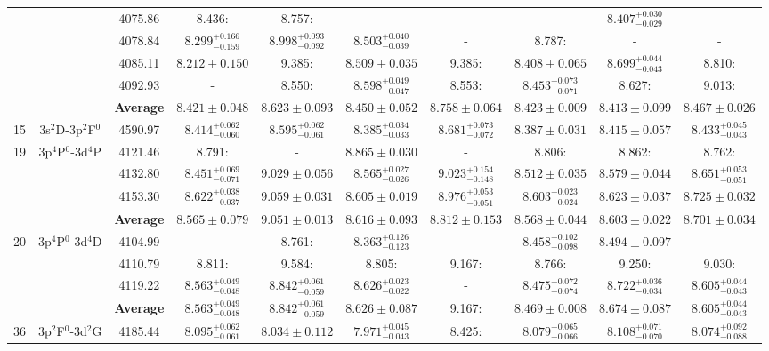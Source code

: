 \documentclass[fleqn,usenatbib]{mnras}
\begin{document}
\begin{sidewaystable*}
\begin{tabular}{cccccccccc}
&&4075.86 & 8.436: & 8.757: &-&-&-& $8.407^{+0.030} _{-0.029}$ & - \\
&&4078.84 & $8.299^{+0.166} _{-0.159}$ & $8.998^{+0.093} _{-0.092}$ & $8.503^{+0.040} _{-0.039}$ & -& 8.787: & -&- \\
&&4085.11 & $8.212 \pm 0.150$ & 9.385: & $8.509 \pm 0.035$ & 9.385:  & $8.408 \pm 0.065$ & $8.699^{+0.044} _{-0.043}$ & 8.810: \\
&&4092.93 & -&  8.550: & $8.598^{+0.049} _{-0.047}$ & 8.553: & $8.453^{+0.073} _{-0.071}$ & 8.627: & 9.013: \\
&&\textbf{Average} & $8.421 \pm 0.048$ & $8.623 \pm 0.093$  &$8.450 \pm 0.052$&  $8.758 \pm 0.064$ &$8.423 \pm 0.009$&$8.413 \pm 0.099$ & $8.467 \pm 0.026$ \\
15& 3s$^{2}$D-3p$^{2}$F$^{0}$  &4590.97 & $8.414^{+0.062} _{-0.060}$ & $8.595^{+0.062} _{-0.061}$  & $8.385^{+0.034} _{-0.033}$ &  $8.681^{+0.073} _{-0.072}$  & $8.387 \pm 0.031$ & $8.415 \pm 0.057$ & $8.433^{+0.045} _{-0.043}$  \\
19& 3p$^{4}$P$^{0}$-3d$^{4}$P &4121.46 & 8.791:& -& $8.865 \pm 0.030$ & -& 8.806: & 8.862: & 8.762: \\
&&4132.80 & $8.451^{+0.069} _{-0.071}$ & $9.029 \pm 0.056 $ & $8.565^{+0.027} _{-0.026}$ & $9.023^{+0.154} _{-0.148}$ & $8.512 \pm 0.035$  & $8.579 \pm 0.044$ & $8.651^{+0.053} _{-0.051}$ \\
&&4153.30 & $8.622^{+0.038} _{-0.037}$ & $9.059 \pm 0.031 $ & $8.605 \pm 0.019$ & $8.976^{+0.053} _{-0.051}$ & $8.603^{+0.023} _{-0.024}$ & $8.623 \pm 0.037$& $8.725 \pm 0.032$  \\
&&\textbf{Average} & $8.565 \pm 0.079$ & $9.051 \pm 0.013$ &$8.616 \pm 0.093$& $8.812 \pm 0.153$ &$8.568 \pm 0.044$&$8.603 \pm 0.022$ & $8.701 \pm 0.034$\\
20& 3p$^{4}$P$^{0}$-3d$^{4}$D &4104.99 & -& 8.761: & $8.363 ^{+0.126} _{-0.123}$& -&$8.458^{+0.102} _{-0.098}$ & $8.494 \pm 0.097$ & -\\
&&4110.79 & 8.811: & 9.584: & 8.805: & 9.167: & 8.766:& 9.250: & 9.030: \\
&&4119.22 & $8.563^{+0.049} _{-0.048}$ & $8.842^{+0.061} _{-0.059}$  & $8.626^{+0.023} _{-0.022}$ &-& $8.475^{+0.072} _{-0.074}$ & $8.722^{+0.036} _{-0.034}$ & $8.605^{+0.044} _{-0.043}$ \\
&&\textbf{Average}  & $8.563^{+0.049} _{-0.048}$& $8.842^{+0.061} _{-0.059}$ &$8.626 \pm 0.087$& 9.167: &$8.469 \pm 0.008$&$8.674 \pm 0.087$&$8.605^{+0.044} _{-0.043}$\\
36& 3p$^{2}$F$^{0}$-3d$^{2}$G &4185.44 & $8.095^{+0.062} _{-0.061}$  & $8.034 \pm 0.112 $ & $7.971^{+0.045} _{-0.043}$  &  8.425: & $8.079^{+0.065} _{-0.066}$ & $8.108^{+0.071} _{-0.070}$ & $8.074^{+0.092} _{-0.088}$   \\

\end{tabular}
\end{sidewaystable*}
\end{document}
